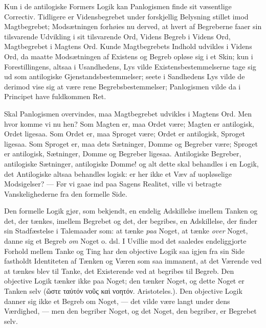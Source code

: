 \documentclass[12pt]{book}
\newcommand{\opage}[1]{\marginnote{\footnotesize\textit{[#1]}}}
\begin{document}
Kun i de antilogiske Formers Logik kan Panlogismen
finde sit væsentlige Correctiv. Tidligere er Vidensbegrebet
under forskjellig Belysning stillet imod Magtbegrebet; Modsætningen
forhøies nu derved, at hvert af Begreberne faaer
sin tilsvarende Udvikling i sit tilsvarende Ord, Videns Begreb
i Videns Ord, Magtbegrebet i Magtens Ord. Kunde Magtbegrebets
Indhold udvikles i Videns Ord, da maatte Modsætningen
af Existens og Begreb opløse sig i et Skin; kun
i Forestillingens, altsaa i Usandhedens, Lys vilde Existensbestemmelserne
tage sig ud som antilogiske Gjenstandsbestemmelser;
seete i Sandhedens Lys vilde de derimod vise sig at
være rene Begrebsbestemmelser; Panlogismen vilde da i Principet
have fuldkommen Ret.

Skal Panlogismen overvindes, maa Magtbegrebet udvikles
i Magtens Ord. Men hvor komme vi nu hen? Som
\opage{119}Magten er, maa Ordet være; Magten er antilogisk, Ordet
ligesaa. Som Ordet er, maa Sproget være; Ordet er antilogisk,
Sproget ligesaa. Som Sproget er, maa dets Sætninger,
Domme og Begreber være; Sproget er antilogisk,
Sætninger, Domme og Begreber ligesaa. Antilogiske Begreber,
antilogiske Sætninger, antilogiske Domme! og alt dette skal
behandles i en Logik, det Antilogiske altsaa behandles logisk:
er her ikke et Væv af uopløselige Modsigelser? --- Før vi gaae %
ind paa Sagens Realitet, ville vi betragte Vanskelighederne
fra den formelle Side.

Den formelle Logik gjør, som bekjendt, en endelig Adskillelse
imellem Tanken og det, der tænkes, imellem Begrebet
og det, der begribes, en Adskillelse, der finder sin Stadfæstelse
i Talemaader som: at tænke \emph{paa} Noget, at tænke \emph{over} Noget,
danne sig et Begreb \emph{om} Noget o. dsl. I Uvillie mod det
saaledes endeliggjorte Forhold mellem Tanke og Ting har
den objective Logik saa igjen fra sin Side fastholdt Identiteten
af Tænken og Væren som saa immanent, at det Værende ved
at tænkes blev til Tanke, det Existerende ved at begribes til
Begreb. Den objective Logik tænker ikke paa Noget; den
tænker Noget, og dette Noget er Tanken selv (ὥστε ταὐτόν %
νοῦς καὶ νοητόν. Aristoteles.). Den objective Logik danner
sig ikke et Begreb om Noget, --- det vilde være langt under
dens Værdighed, --- men den begriber Noget, og det Noget,
den begriber, er Begrebet selv.
\end{document}
